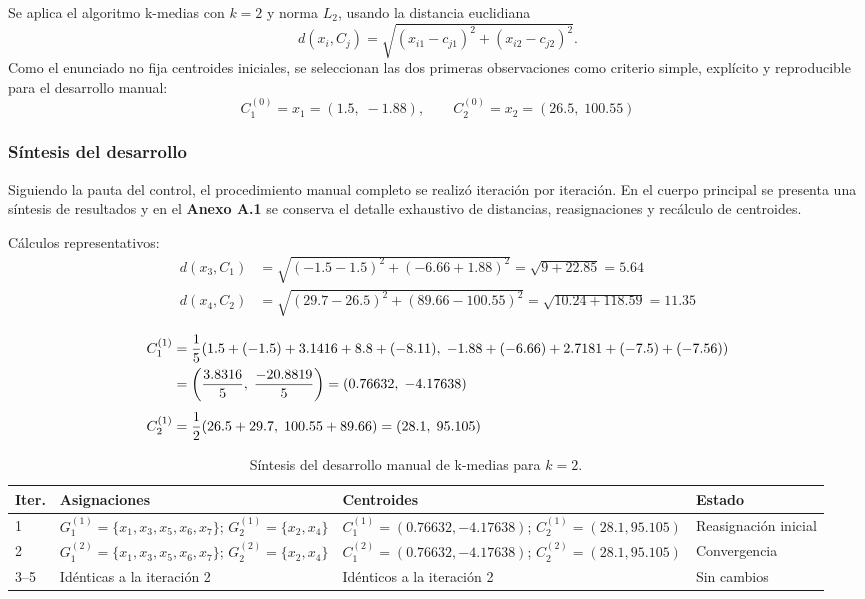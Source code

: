 \documentclass[10pt,a4paper]{article}
\begin{document}
Se aplica el algoritmo k-medias con $k=2$ y norma $L_2$, usando la distancia euclidiana
\begin{equation}
d(x_i, C_j) = \sqrt{(x_{i1} - c_{j1})^2 + (x_{i2} - c_{j2})^2}.
\label{eq:distancia}
\end{equation}
Como el enunciado no fija centroides iniciales, se seleccionan las dos primeras observaciones como criterio simple, expl\'icito y reproducible para el desarrollo manual:
\begin{equation}
C_1^{(0)} = x_1 = (1.5,\; -1.88), \qquad C_2^{(0)} = x_2 = (26.5,\; 100.55)
\label{eq:centroides-iniciales}
\end{equation}

\subsubsection*{S\'intesis del desarrollo}

Siguiendo la pauta del control, el procedimiento manual completo se realiz\'o iteraci\'on por iteraci\'on. En el cuerpo principal se presenta una s\'intesis de resultados y en el \textbf{Anexo A.1} se conserva el detalle exhaustivo de distancias, reasignaciones y rec\'alculo de centroides.

C\'alculos representativos:
\begin{align}
d(x_3, C_1) &= \sqrt{(-1.5-1.5)^2 + (-6.66+1.88)^2} = \sqrt{9 + 22.85} = 5.64 \label{eq:calc-x3}\\
d(x_4, C_2) &= \sqrt{(29.7-26.5)^2 + (89.66-100.55)^2} = \sqrt{10.24 + 118.59} = 11.35 \label{eq:calc-x4}
\end{align}

\begin{align}
C_1^{(1)} &= \frac{1}{5}(1.5 + (-1.5) + 3.1416 + 8.8 + (-8.11),\; -1.88 + (-6.66) + 2.7181 + (-7.5) + (-7.56)) \notag\\
&= \left(\frac{3.8316}{5},\; \frac{-20.8819}{5}\right) = (0.76632,\; -4.17638) \label{eq:centroide-c1}\\[4pt]
C_2^{(1)} &= \frac{1}{2}(26.5 + 29.7,\; 100.55 + 89.66) = (28.1,\; 95.105) \label{eq:centroide-c2}
\end{align}

\begin{table}[H]
\centering
\scriptsize
\begin{tabular}{p{1.5cm} p{5.8cm} p{5.2cm} p{2.7cm}}
\toprule
\textbf{Iter.} & \textbf{Asignaciones} & \textbf{Centroides} & \textbf{Estado} \\
\midrule
1 & $G_1^{(1)}=\{x_1,x_3,x_5,x_6,x_7\}$; $G_2^{(1)}=\{x_2,x_4\}$ & $C_1^{(1)}=(0.76632,-4.17638)$; $C_2^{(1)}=(28.1,95.105)$ & Reasignaci\'on inicial \\
2 & $G_1^{(2)}=\{x_1,x_3,x_5,x_6,x_7\}$; $G_2^{(2)}=\{x_2,x_4\}$ & $C_1^{(2)}=(0.76632,-4.17638)$; $C_2^{(2)}=(28.1,95.105)$ & Convergencia \\
3--5 & Id\'enticas a la iteraci\'on 2 & Id\'enticos a la iteraci\'on 2 & Sin cambios \\
\bottomrule
\end{tabular}
\caption{S\'intesis del desarrollo manual de k-medias para $k=2$.}
\label{tab:manual-resumen}
\end{table}
\end{document}

